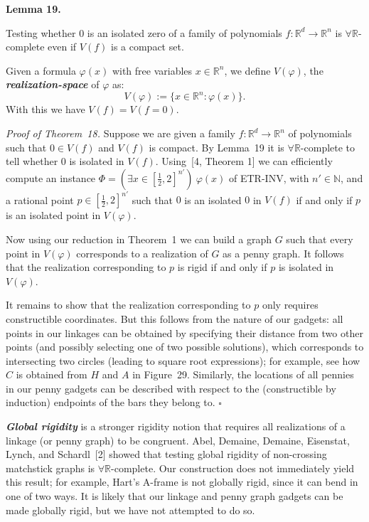 \documentclass{article}
\newcommand{\defn}[1]{\textit{\textbf{\boldmath #1}}}
\begin{document}
\par\medskip\noindent\textbf{Lemma 19.} \begin{itshape}
    Testing whether $0$ is an isolated zero of a family of polynomials $f: \ensuremath{\mathbb{R}}^d\rightarrow \ensuremath{\mathbb{R}}^n$ is \ensuremath{\forall\mathbb{R}}-complete even if $V(f)$ is a compact set.
\end{itshape}\par\medskip

Given a formula $\varphi(x)$ with free variables $x \in \ensuremath{\mathbb{R}}^n$, we define
$V(\varphi)$, the  \defn{realization-space} of $\varphi$ as:
\[V(\varphi) := \{x \in \ensuremath{\mathbb{R}}^n: \varphi(x)\}.\]
With this we have $V(f) = V(f = 0)$.

\par\noindent\textit{Proof of Theorem~18.} 
Suppose we are given a family $f: \ensuremath{\mathbb{R}}^d\rightarrow \ensuremath{\mathbb{R}}^n$ of polynomials such that $0 \in V(f)$ and $V(f)$ is compact. By Lemma~19 it is \ensuremath{\forall\mathbb{R}}-complete to tell whether $0$ is isolated in $V(f)$. Using~[4, Theorem 1] we can efficiently compute an instance $\Phi = (\exists x \in [\frac{1}{2},2]^{n'})\ \varphi(x)$ of \textnormal{\textsc{ETR-INV}}, with $n' \in \ensuremath{\mathbb{N}}$, and a rational point $p \in [\frac{1}{2},2]^{n'}$ such that $0$ is an isolated $0$ in $V(f)$ if and only if $p$ is an isolated point in $V(\varphi)$. 

Now using our reduction in Theorem~1 we can build a graph $G$ such that every point in $V(\varphi)$ corresponds to a realization of $G$ as a penny graph. It follows that the realization corresponding to $p$ is rigid if and only if $p$ is isolated in $V(\varphi)$. 

It remains to show that the realization corresponding to $p$ only requires constructible coordinates. But this follows from the nature of our gadgets: all points in our linkages can be obtained by specifying their distance from two other points (and possibly selecting one of two possible solutions), which corresponds to intersecting two circles (leading to square root expressions); for example, see how $C$ is obtained from $H$ and $A$ in Figure~29. Similarly, the locations of all pennies in our penny gadgets can be described with respect to the (constructible by induction) endpoints of the bars they belong to.
\hfill$\square$\par\medskip

\defn{Global rigidity} is a stronger rigidity notion that requires all realizations of a linkage (or penny graph) to be congruent. Abel, Demaine, Demaine, Eisenstat, Lynch, and Schardl~[2] showed that testing global rigidity of non-crossing matchstick graphs is \ensuremath{\forall\mathbb{R}}-complete. Our construction does not immediately yield this result; for example, Hart's A-frame is not globally rigid, since it can bend in one of two ways. It is likely that our linkage and penny graph gadgets can be made globally rigid, but we have not attempted to do so. 
\end{document}
